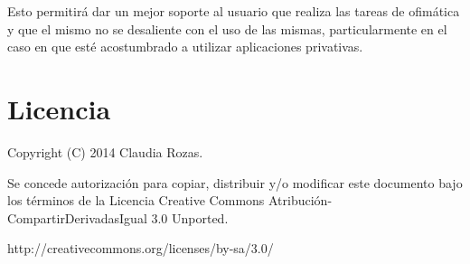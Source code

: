 \documentclass[12pt]{article}
\begin{document}
Esto permitirá dar un mejor soporte al usuario que realiza las tareas de ofimática y que el mismo no se desaliente con el uso de las mismas, particularmente en el caso en que esté acostumbrado a utilizar aplicaciones privativas.

\section{Licencia}
Copyright (C) 2014 Claudia Rozas.

Se concede autorización para copiar, distribuir y/o modificar este documento
bajo los términos de la Licencia Creative Commons Atribución-CompartirDerivadasIgual 3.0 Unported. 

http://creativecommons.org/licenses/by-sa/3.0/
\end{document}
